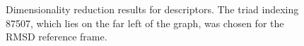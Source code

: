 \documentclass[a4paper]{article}
\begin{document}
\begin{figure}[H]
    \caption{Dimensionality reduction results for descriptors. The triad indexing 87507, which lies on the far left of the graph, was chosen for the RMSD reference frame.  }
    \label{fig:dimreduct_descriptors}
\end{figure}

\pagebreak


\end{document}
